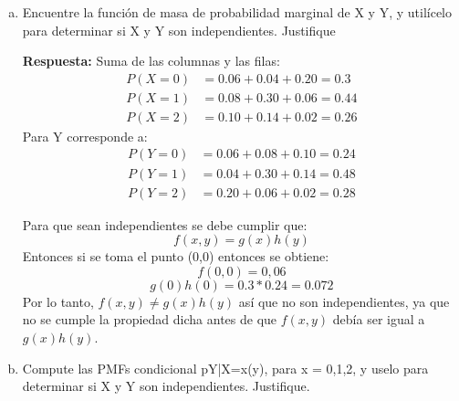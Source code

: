 \documentclass{article}\usepackage[]{graphicx}\usepackage[]{color}
\begin{document}
\begin{enumerate}[(a)]
    \item Encuentre la función de masa de probabilidad marginal de X y Y, y utilícelo para determinar si X y Y son independientes. Justifique
    
    \textbf{Respuesta:} Suma de las columnas y las filas:
    \begin{align*}
        P(X=0) &= 0.06+0.04+0.20 = 0.3\\
        P(X=1) &= 0.08+0.30+0.06= 0.44\\
        P(X=2) &= 0.10+0.14+0.02=0.26
    \end{align*}
    Para Y corresponde a:
    \begin{align*}
        P(Y=0) &= 0.06+0.08+0.10=0.24\\
        P(Y=1) &= 0.04+0.30+0.14= 0.48\\
        P(Y=2) &= 0.20+0.06+0.02=0.28
    \end{align*}
    
Para que sean independientes se debe cumplir que:
\[f(x,y) = g(x)h(y)\]
Entonces si se toma el punto (0,0) entonces se obtiene:
\[f(0,0) = 0,06\]
\[g(0)h(0) = 0.3*0.24 = 0.072\]
Por lo tanto, $f(x,y) \neq g(x)h(y)$ así que no son independientes, ya que no se cumple la propiedad dicha antes de que $f(x,y)$ debía ser igual a $g(x)h(y)$.


\item Compute las PMFs condicional pY|X=x(y), para x = 0,1,2, y uselo para determinar si X y Y son independientes. Justifique.


\end{enumerate}
\end{document}
